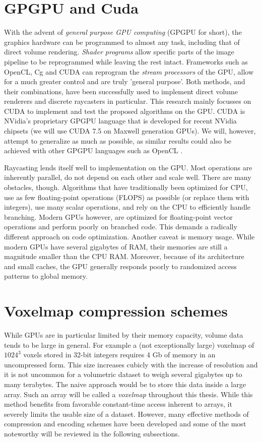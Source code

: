 \section{GPGPU and Cuda} \label{sec:gpgpu}
%
With the advent of \textit{general purpose GPU computing} (GPGPU for short), the graphics hardware can be programmed to almost any task, including that of direct volume rendering. \emph{Shader programs} allow specific parts of the image pipeline to be reprogrammed while leaving the rest intact. Frameworks such as OpenCL, Cg and CUDA can reprogram the \emph{stream processors} of the GPU, allow for a much greater control and are truly 'general purpose'. Both methods, and their combinations, have been successfully used to implement direct volume renderers and discrete raycasters in particular. This research mainly focusses on CUDA to implement and test the proposed algorithms on the GPU. CUDA is NVidia's proprietary GPGPU language that is developed for recent NVidia chipsets (we will use CUDA 7.5 on Maxwell generation GPUs). We will, however, attempt to generalize as much as possible, as similar results could also be achieved with other GPGPU languages such as OpenCL \cite{6047190}.

Raycasting lends itself well to implementation on the GPU. Most operations are inherently parallel, do not depend on each other and scale well. There are many obstacles, though. Algorithms that have traditionally been optimized for CPU, use as few floating-point operations (FLOPS) as possible (or replace them with integers), use many scalar operations, and rely on the CPU to efficiently handle branching. Modern GPUs however, are optimized for floating-point vector operations and perform poorly on branched code. This demands a radically different approach on code optimization. Another caveat is memory usage. While modern GPUs have several gigabytes of RAM, their memories are still a magnitude smaller than the CPU RAM. Moreover, because of its architecture and small caches, the GPU generally responds poorly to randomized access patterns to global memory.
%
\section{Voxelmap compression schemes}
%
While GPUs are in particular limited by their memory capacity, volume data tends to be large in general. For example a (not exceptionally large) voxelmap of $1024^{3}$ voxels stored in 32-bit integers requires 4 Gb of memory in an uncompressed form. This size increases cubicly with the increase of resolution and it is not uncommon for a volumetric dataset to weigh several gigabytes up to many terabytes. The naive approach would be to store this data inside a large array. Such an array will be called a \emph{voxelmap} throughout this thesis. While this method benefits from favorable constant-time access inherent to arrays, it severely limits the usable size of a dataset.  However, many effective methods of compression and encoding schemes have been developed and some of the most noteworthy will be reviewed in the following subsections.
%
